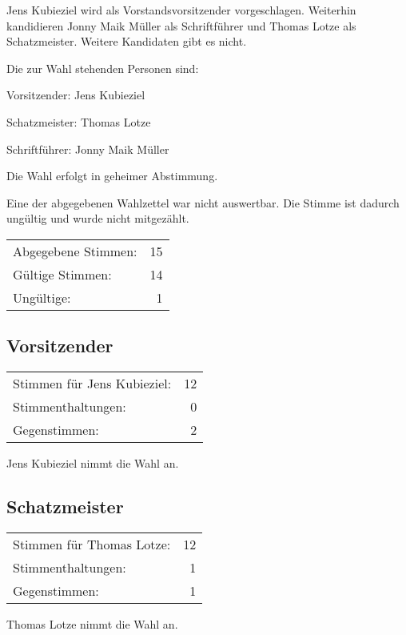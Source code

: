 \documentclass[DIV=calc,parksip=half*]{scrartcl}
\newcommand{\qbi}{Jens Kubieziel}
\newcommand{\jonny}{Jonny Maik Müller}
\newcommand{\thomas}{Thomas Lotze}
\begin{document}
\qbi{} wird als Vorstandsvorsitzender vorgeschlagen. Weiterhin kandidieren
\jonny{} als Schriftführer und \thomas{} als Schatzmeister. Weitere Kandidaten
gibt es nicht.

Die zur Wahl stehenden Personen sind:
\begin{compactenum}
\item Vorsitzender: \qbi{}
\item Schatzmeister: \thomas{}
\item Schriftführer: \jonny{}
\end{compactenum}

Die Wahl erfolgt in geheimer Abstimmung.

Eine der abgegebenen Wahlzettel war nicht auswertbar. Die Stimme ist dadurch ungültig und wurde nicht mitgezählt.

\begin{tabularx}{.9\linewidth}{Xr}
Abgegebene Stimmen: & 15 \\
  Gültige Stimmen: & 14 \\
  Ungültige: & 1\\
\end{tabularx}

\subsection{Vorsitzender}
\begin{tabularx}{.9\linewidth}{Xr}
Stimmen für \qbi{}: & 12 \\
  Stimmenthaltungen: & 0 \\
  Gegenstimmen: & 2\\
\end{tabularx}

\qbi{} nimmt die Wahl an.

\subsection{Schatzmeister}
\begin{tabularx}{.9\linewidth}{Xr}
Stimmen für \thomas{}: & 12\\
Stimmenthaltungen: & 1 \\
Gegenstimmen: & 1
\end{tabularx}

\thomas{} nimmt die Wahl an.
\end{document}
